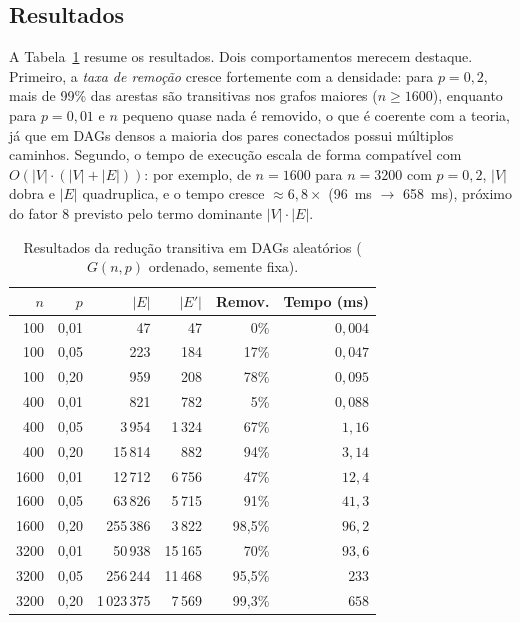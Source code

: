 \documentclass[10pt,twocolumn]{article}
\begin{document}
\subsection{Resultados}

A Tabela~\ref{tab:res} resume os resultados. Dois comportamentos merecem destaque. Primeiro, a \emph{taxa de remoção} cresce fortemente com a densidade: para $p=0{,}2$, mais de 99\% das arestas são transitivas nos grafos maiores ($n \geq 1600$), enquanto para $p=0{,}01$ e $n$ pequeno quase nada é removido, o que é coerente com a teoria, já que em DAGs densos a maioria dos pares conectados possui múltiplos caminhos. Segundo, o tempo de execução escala de forma compatível com $O(|V|\cdot(|V|+|E|))$: por exemplo, de $n=1600$ para $n=3200$ com $p=0{,}2$, $|V|$ dobra e $|E|$ quadruplica, e o tempo cresce $\approx 6{,}8\times$ (96~ms $\to$ 658~ms), próximo do fator 8 previsto pelo termo dominante $|V|\cdot|E|$.

\begin{table}[t]
\centering
\caption{Resultados da redução transitiva em DAGs aleatórios ($G(n,p)$ ordenado, semente fixa).}
\label{tab:res}
\small
\begin{tabular}{rrrrrr}
\toprule
$n$ & $p$ & $|E|$ & $|E'|$ & Remov. & Tempo (ms)\\
\midrule
100  & 0{,}01 & 47      & 47    & 0\%     & $0{,}004$\\
100  & 0{,}05 & 223     & 184   & 17\%    & $0{,}047$\\
100  & 0{,}20 & 959     & 208   & 78\%    & $0{,}095$\\
400  & 0{,}01 & 821     & 782   & 5\%     & $0{,}088$\\
400  & 0{,}05 & 3\,954  & 1\,324 & 67\%   & $1{,}16$\\
400  & 0{,}20 & 15\,814 & 882   & 94\%    & $3{,}14$\\
1600 & 0{,}01 & 12\,712 & 6\,756 & 47\%   & $12{,}4$\\
1600 & 0{,}05 & 63\,826 & 5\,715 & 91\%   & $41{,}3$\\
1600 & 0{,}20 & 255\,386 & 3\,822 & 98{,}5\% & $96{,}2$\\
3200 & 0{,}01 & 50\,938 & 15\,165 & 70\%  & $93{,}6$\\
3200 & 0{,}05 & 256\,244 & 11\,468 & 95{,}5\% & $233$\\
3200 & 0{,}20 & 1\,023\,375 & 7\,569 & 99{,}3\% & $658$\\
\bottomrule
\end{tabular}
\end{table}
\end{document}
